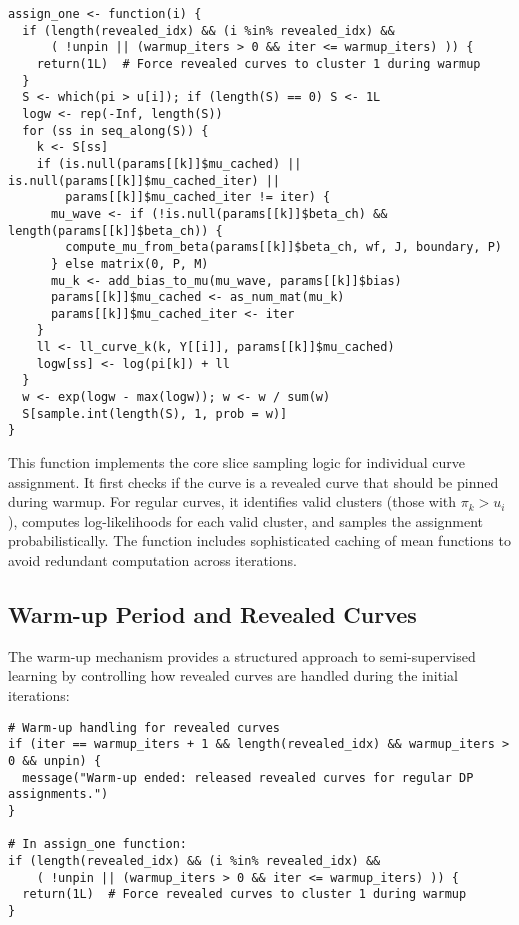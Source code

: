 \documentclass[11pt]{article}
\begin{document}
\begin{lstlisting}
assign_one <- function(i) {
  if (length(revealed_idx) && (i %in% revealed_idx) &&
      ( !unpin || (warmup_iters > 0 && iter <= warmup_iters) )) {
    return(1L)  # Force revealed curves to cluster 1 during warmup
  }
  S <- which(pi > u[i]); if (length(S) == 0) S <- 1L
  logw <- rep(-Inf, length(S))
  for (ss in seq_along(S)) {
    k <- S[ss]
    if (is.null(params[[k]]$mu_cached) || is.null(params[[k]]$mu_cached_iter) ||
        params[[k]]$mu_cached_iter != iter) {
      mu_wave <- if (!is.null(params[[k]]$beta_ch) && length(params[[k]]$beta_ch)) {
        compute_mu_from_beta(params[[k]]$beta_ch, wf, J, boundary, P)
      } else matrix(0, P, M)
      mu_k <- add_bias_to_mu(mu_wave, params[[k]]$bias)
      params[[k]]$mu_cached <- as_num_mat(mu_k)
      params[[k]]$mu_cached_iter <- iter
    }
    ll <- ll_curve_k(k, Y[[i]], params[[k]]$mu_cached)
    logw[ss] <- log(pi[k]) + ll
  }
  w <- exp(logw - max(logw)); w <- w / sum(w)
  S[sample.int(length(S), 1, prob = w)]
}
\end{lstlisting}

This function implements the core slice sampling logic for individual curve assignment. It first checks if the curve is a revealed curve that should be pinned during warmup. For regular curves, it identifies valid clusters (those with $\pi_k > u_i$), computes log-likelihoods for each valid cluster, and samples the assignment probabilistically. The function includes sophisticated caching of mean functions to avoid redundant computation across iterations.

\subsection{Warm-up Period and Revealed Curves}

The warm-up mechanism provides a structured approach to semi-supervised learning by controlling how revealed curves are handled during the initial iterations:

\begin{lstlisting}
# Warm-up handling for revealed curves
if (iter == warmup_iters + 1 && length(revealed_idx) && warmup_iters > 0 && unpin) {
  message("Warm-up ended: released revealed curves for regular DP assignments.")
}

# In assign_one function:
if (length(revealed_idx) && (i %in% revealed_idx) &&
    ( !unpin || (warmup_iters > 0 && iter <= warmup_iters) )) {
  return(1L)  # Force revealed curves to cluster 1 during warmup
}
\end{lstlisting}
\end{document}
